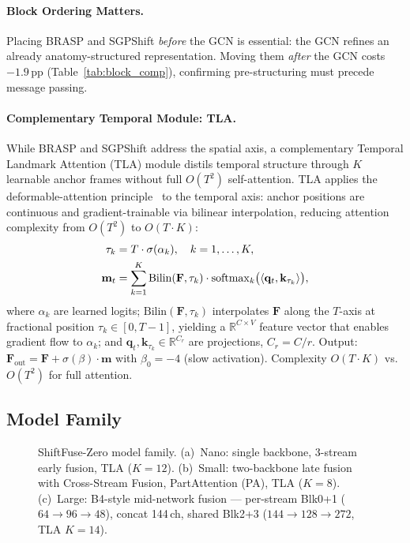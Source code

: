 \documentclass[sigconf,screen,review,anonymous]{acmart}
\begin{document}
\paragraph{Block Ordering Matters.}
Placing BRASP and SGPShift \emph{before} the GCN is essential: the GCN
refines an already anatomy-structured representation.
Moving them \emph{after} the GCN costs $-1.9$\,pp
(Table~\ref{tab:block_comp}), confirming pre-structuring must precede
message passing.

\paragraph{Complementary Temporal Module: TLA.}
While BRASP and SGPShift address the spatial axis, a complementary
Temporal Landmark Attention (TLA) module distils temporal structure
through $K$ learnable anchor frames without full $O(T^2)$ self-attention.
TLA applies the deformable-attention principle~\cite{deformabledetr}
to the temporal axis: anchor positions are continuous and
gradient-trainable via bilinear interpolation, reducing attention
complexity from $O(T^2)$ to $O(T{\cdot}K)$:
\begin{align}
  \tau_k &= T\cdot\sigma(\alpha_k),\quad k=1,\ldots,K,
  \label{eq:tla_anchors}\\
  \mathbf{m}_t &= \sum_{k=1}^{K}
    \mathrm{Bilin}(\mathbf{F},\tau_k)\cdot
    \mathrm{softmax}_k\bigl(\langle\mathbf{q}_t,\mathbf{k}_{\tau_k}\rangle\bigr),
  \notag
\end{align}
where $\alpha_k$ are learned logits; $\mathrm{Bilin}(\mathbf{F},\tau_k)$
interpolates $\mathbf{F}$ along the $T$-axis at fractional position
$\tau_k\!\in\![0,T{-}1]$, yielding a $\mathbb{R}^{C\times V}$ feature vector
that enables gradient flow to $\alpha_k$;
and $\mathbf{q}_t,\mathbf{k}_{\tau_k}\!\in\!\mathbb{R}^{C_r}$ are projections, $C_r{=}C/r$.
Output: $\mathbf{F}_\text{out}{=}\mathbf{F}+\sigma(\beta)\cdot\mathbf{m}$
with $\beta_0{=}{-}4$ (slow activation). Complexity $O(T{\cdot}K)$
vs.\ $O(T^2)$ for full attention.

\subsection{Model Family}\label{sec:family}

\begin{figure}[t]
\centering
\resizebox{0.85\textwidth}{!}{}
\caption{ShiftFuse-Zero model family.
  (a)~Nano: single backbone, 3-stream early fusion, TLA ($K{=}12$).
  (b)~Small: two-backbone late fusion with Cross-Stream Fusion, PartAttention (PA), TLA ($K{=}8$).
  (c)~Large: B4-style mid-network fusion ---
       per-stream Blk0+1 ($64{\to}96{\to}48$), concat 144\,ch, shared Blk2+3 ($144{\to}128{\to}272$, TLA $K{=}14$).}
\label{fig:family}
\end{figure}
\end{document}
